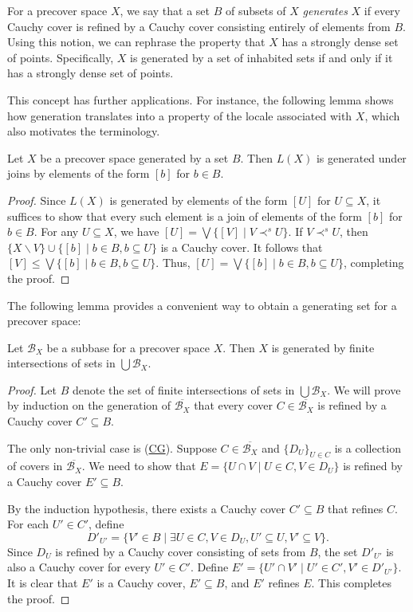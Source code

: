 \documentclass[reqno]{amsart}
\newcommand{\axref}[1]{(\hyperref[ax:#1]{#1})}
\theoremstyle{definition}
\theoremstyle{remark}
\numberwithin{figure}{section}
\newcommand{\rb}{\prec}
\begin{document}
For a precover space $X$, we say that a set $B$ of subsets of $X$ \emph{generates} $X$ if every Cauchy cover is refined by a Cauchy cover consisting entirely of elements from $B$.
Using this notion, we can rephrase the property that $X$ has a strongly dense set of points.
Specifically, $X$ is generated by a set of inhabited sets if and only if it has a strongly dense set of points.

This concept has further applications.
For instance, the following lemma shows how generation translates into a property of the locale associated with $X$, which also motivates the terminology.

\begin{lem}
Let $X$ be a precover space generated by a set $B$.
Then $L(X)$ is generated under joins by elements of the form $[b]$ for $b \in B$.
\end{lem}
\begin{proof}
Since $L(X)$ is generated by elements of the form $[U]$ for $U \subseteq X$, it suffices to show that every such element is a join of elements of the form $[b]$ for $b \in B$.
For any $U \subseteq X$, we have $[U] = \bigvee \{ [V] \mid V \rb^s U \}$.
If $V \rb^s U$, then $\{ X \backslash V \} \cup \{ [b] \mid b \in B, b \subseteq U \}$ is a Cauchy cover.
It follows that $[V] \leq \bigvee \{ [b] \mid b \in B, b \subseteq U \}$.
Thus, $[U] = \bigvee \{ [b] \mid b \in B, b \subseteq U \}$, completing the proof.
\end{proof}

The following lemma provides a convenient way to obtain a generating set for a precover space:

\begin{lem}
Let $\mathcal{B}_X$ be a subbase for a precover space $X$.
Then $X$ is generated by finite intersections of sets in $\bigcup \mathcal{B}_X$.
\end{lem}
\begin{proof}
Let $B$ denote the set of finite intersections of sets in $\bigcup \mathcal{B}_X$.
We will prove by induction on the generation of $\overline{\mathcal{B}_X}$ that every cover $C \in \overline{\mathcal{B}_X}$ is refined by a Cauchy cover $C' \subseteq B$.

The only non-trivial case is \axref{CG}.
Suppose $C \in \overline{\mathcal{B}_X}$ and $\{ D_U \}_{U \in C}$ is a collection of covers in $\overline{\mathcal{B}_X}$.
We need to show that $E = \{ U \cap V \mid U \in C, V \in D_U \}$ is refined by a Cauchy cover $E' \subseteq B$.

By the induction hypothesis, there exists a Cauchy cover $C' \subseteq B$ that refines $C$.
For each $U' \in C'$, define 
\[
D'_{U'} = \{ V' \in B \mid \exists U \in C, V \in D_U, U' \subseteq U, V' \subseteq V \}.
\]
Since $D_U$ is refined by a Cauchy cover consisting of sets from $B$, the set $D'_{U'}$ is also a Cauchy cover for every $U' \in C'$.
Define $E' = \{ U' \cap V' \mid U' \in C', V' \in D'_{U'} \}$.
It is clear that $E'$ is a Cauchy cover, $E' \subseteq B$, and $E'$ refines $E$.
This completes the proof.
\end{proof}
\end{document}
